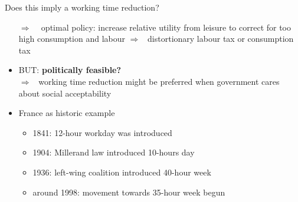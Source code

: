 \documentclass[11pt,aspectratio=169]{beamer}
\newcommand{\ar}{$\Rightarrow$ \ }
\begin{document}
\begin{frame}{Does this imply a working time reduction?}
	
	\begin{itemize}
	\item[\ar] optimal policy: increase relative utility from leisure to correct for too high consumption and labour \ar distortionary labour tax or consumption tax
	\item BUT: \textbf{\alert{politically feasible?}} \\ \ar working time reduction might be preferred when government cares about social acceptability \citep{Alvarez-Cuadrado2007EnvyHours}
	\item France as historic example \citep[based on][]{Alvarez-Cuadrado2007EnvyHours}
\begin{itemize}
	\item 1841: 12-hour workday was introduced
	\item 1904: Millerand law introduced 10-hours day
	\item 1936: left-wing coalition introduced 40-hour week
	\item around 1998: movement towards 35-hour week begun
\end{itemize}
\end{itemize}
\end{frame}
\end{document}
